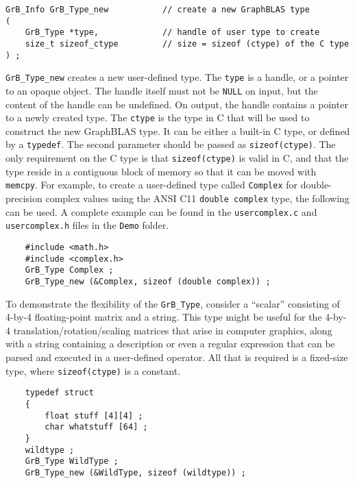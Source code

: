 \documentclass[12pt]{article}
\begin{document}
\begin{mdframed}[userdefinedwidth=6in]
{\footnotesize
\begin{verbatim}
GrB_Info GrB_Type_new           // create a new GraphBLAS type
(
    GrB_Type *type,             // handle of user type to create
    size_t sizeof_ctype         // size = sizeof (ctype) of the C type
) ;
\end{verbatim}
}\end{mdframed}

\verb'GrB_Type_new' creates a new user-defined type.  The \verb'type' is a
handle, or a pointer to an opaque object.  The handle itself must not be
\verb'NULL' on input, but the content of the handle can be undefined.  On
output, the handle contains a pointer to a newly created type.
The \verb'ctype' is the type in C that will be used to construct the new
GraphBLAS type.  It can be either a built-in C type, or defined by a
\verb'typedef'.
The second parameter should be passed as \verb'sizeof(ctype)'.  The only
requirement on the C type is that \verb'sizeof(ctype)' is valid in C, and
that the type reside in a contiguous block of memory so that it can be moved
with \verb'memcpy'.  For example, to create a user-defined type called
\verb'Complex' for double-precision complex values using the ANSI C11
\verb'double complex' type, the following can be used.  A complete example can
be found in the \verb'usercomplex.c' and \verb'usercomplex.h' files in the
\verb'Demo' folder.

    {\footnotesize
    \begin{verbatim}
    #include <math.h>
    #include <complex.h>
    GrB_Type Complex ;
    GrB_Type_new (&Complex, sizeof (double complex)) ;    \end{verbatim} }

To demonstrate the flexibility of the \verb'GrB_Type', consider a ``scalar''
consisting of 4-by-4 floating-point matrix and a string.  This type might be
useful for the 4-by-4 translation/rotation/scaling matrices that arise in
computer graphics, along with a string containing a description or even a
regular expression that can be parsed and executed in a user-defined operator.
All that is required is a fixed-size type, where \verb'sizeof(ctype)' is
a constant.

    {\footnotesize
    \begin{verbatim}
    typedef struct
    {
        float stuff [4][4] ;
        char whatstuff [64] ;
    }
    wildtype ;
    GrB_Type WildType ;
    GrB_Type_new (&WildType, sizeof (wildtype)) ; \end{verbatim} }
\end{document}
